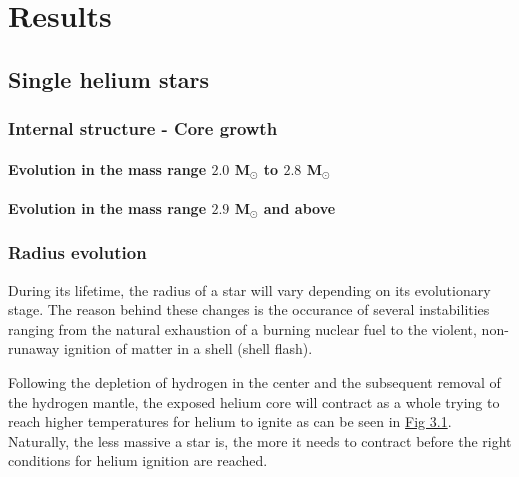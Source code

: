 \documentclass[../../main/thesis_msc.tex]{subfiles}
\begin{document}
	\chapter{Results}
	
		
		
			\section{Single helium stars}
			
				\subsection{Internal structure - Core growth}
				
					\subsubsection{Evolution in the mass range $2.0$ M$_{\odot}$ to $2.8$ M$_{\odot}$}
					
					\subsubsection{Evolution in the mass range $2.9$ M$_{\odot}$ and above}
				
				
				\subsection{Radius evolution}
					During its lifetime, the radius of a star will vary depending on its evolutionary stage. The reason behind these changes is the occurance of several instabilities ranging from the natural exhaustion of a burning nuclear fuel to the violent, non-runaway ignition of matter in a shell (shell flash). 
					
					Following the depletion of hydrogen in the center and the subsequent removal of the hydrogen mantle, the exposed helium core will contract as a whole trying to reach higher temperatures for helium to ignite as can be seen in \hyperref[fig:radii_singles]{Fig 3.1}. Naturally, the less massive a star is, the more it needs to contract before the right conditions for helium ignition are reached.
				
\end{document}
